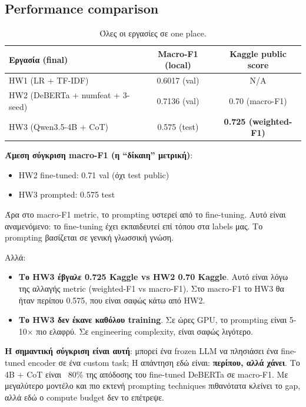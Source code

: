 \documentclass[12pt]{fphw}
\begin{document}
\subsection{Performance comparison}

\begin{table}[H]
\centering
\small
\begin{tabular}{lcc}
\toprule
Εργασία (final) & Macro-F1 (local) & Kaggle public score \\
\midrule
HW1 (LR + TF-IDF) & 0.6017 (val) & N/A \\
HW2 (DeBERTa + numfeat + 3-seed) & 0.7136 (val) & 0.70 (macro-F1) \\
HW3 (Qwen3.5-4B + CoT) & 0.575 (test) & \textbf{0.725 (weighted-F1)} \\
\bottomrule
\end{tabular}
\caption{Όλες οι εργασίες σε one place.}
\end{table}

\textbf{Άμεση σύγκριση macro-F1 (η ``δίκαιη'' μετρική)}:

\begin{itemize}
    \item HW2 fine-tuned: 0.71 val (όχι test public)
    \item HW3 prompted: 0.575 test
\end{itemize}

Άρα στο macro-F1 metric, το prompting υστερεί από το fine-tuning. Αυτό είναι αναμενόμενο: το fine-tuning έχει εκπαιδευτεί επί τόπου στα labels μας. Το prompting βασίζεται σε γενική γλωσσική γνώση.

Αλλά:

\begin{itemize}
    \item \textbf{Το HW3 έβγαλε 0.725 Kaggle vs HW2 0.70 Kaggle}. Αυτό είναι λόγω της αλλαγής metric (weighted-F1 vs macro-F1). Στο macro-F1 το HW3 θα ήταν περίπου 0.575, που είναι σαφώς κάτω από HW2.
    \item \textbf{Το HW3 δεν έκανε καθόλου training}. Σε ώρες GPU, το prompting είναι 5-10× πιο ελαφρύ. Σε engineering complexity, είναι σαφώς λιγότερο.
\end{itemize}

\textbf{Η σημαντική σύγκριση είναι αυτή}: μπορεί ένα frozen LLM να πλησιάσει ένα fine-tuned encoder σε ένα custom task; Η απάντηση εδώ είναι: \textbf{περίπου, αλλά χάνει}. Το 4B + CoT είναι ~80\% της απόδοσης του fine-tuned DeBERTa σε macro-F1. Με μεγαλύτερο μοντέλο και πιο εκτενή prompting techniques πιθανότατα κλείνει το gap, αλλά εδώ ο compute budget δεν το επέτρεψε.
\end{document}
